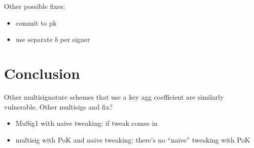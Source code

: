 \documentclass[a4paper,orivec,oribibl,english]{llncs}
\begin{document}
Other possible fixes:
\begin{itemize}
\item commit to pk
\item use separate $b$ per signer
\end{itemize}

\section{Conclusion}
Other multisignature schemes that use a key agg coefficient are similarly vulnerable.
Other multisigs and fix?
\begin{itemize}
\item MuSig1 with naive tweaking: if tweak comes in
\item multisig with PoK and naive tweaking: there's no ``naive'' tweaking with PoK
\end{itemize}
\end{document}
